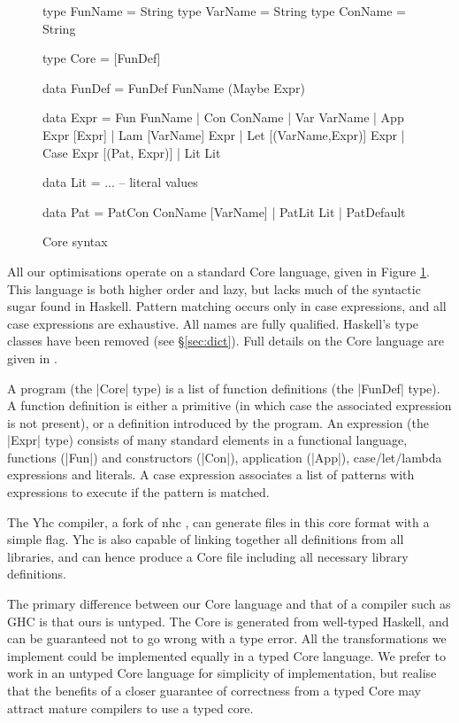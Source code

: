 \documentclass{llncs}
\begin{document}
\begin{figure}
\begin{code}
type FunName  = String
type VarName  = String
type ConName  = String

type Core = [FunDef]

data FunDef  =  FunDef FunName (Maybe Expr)

data Expr  =  Fun   FunName
           |  Con   ConName
           |  Var   VarName
           |  App   Expr [Expr]
           |  Lam   [VarName] Expr
           |  Let   [(VarName,Expr)] Expr
           |  Case  Expr [(Pat, Expr)]
           |  Lit   Lit

data Lit = ... -- literal values

data Pat = PatCon  ConName [VarName]
         | PatLit  Lit
         | PatDefault
\end{code}
\caption{Core syntax}
\label{fig:core}
\end{figure}

All our optimisations operate on a standard Core language, given in Figure \ref{fig:core}. This language is both higher order and lazy, but lacks much of the syntactic sugar found in Haskell. Pattern matching occurs only in case expressions, and all case expressions are exhaustive. All names are fully qualified. Haskell's type classes have been removed (see \S\ref{sec:dict}). Full details on the Core language are given in \cite{me:yhc_core}.

A program (the |Core| type) is a list of function definitions (the |FunDef| type). A function definition is either a primitive (in which case the associated expression is not present), or a definition introduced by the program. An expression (the |Expr| type) consists of many standard elements in a functional language, functions (|Fun|) and constructors (|Con|), application (|App|), case/let/lambda expressions and literals. A case expression associates a list of patterns with expressions to execute if the pattern is matched.

The Yhc compiler, a fork of nhc \cite{nhc}, can generate files in this core format with a simple flag. Yhc is also capable of linking together all definitions from all libraries, and can hence produce a Core file including all necessary library definitions.

The primary difference between our Core language and that of a compiler such as GHC is that ours is untyped. The Core is generated from well-typed Haskell, and can be guaranteed not to go wrong with a type error. All the transformations we implement could be implemented equally in a typed Core language. We prefer to work in an untyped Core language for simplicity of implementation, but realise that the benefits of a closer guarantee of correctness from a typed Core may attract mature compilers to use a typed core.
\end{document}

